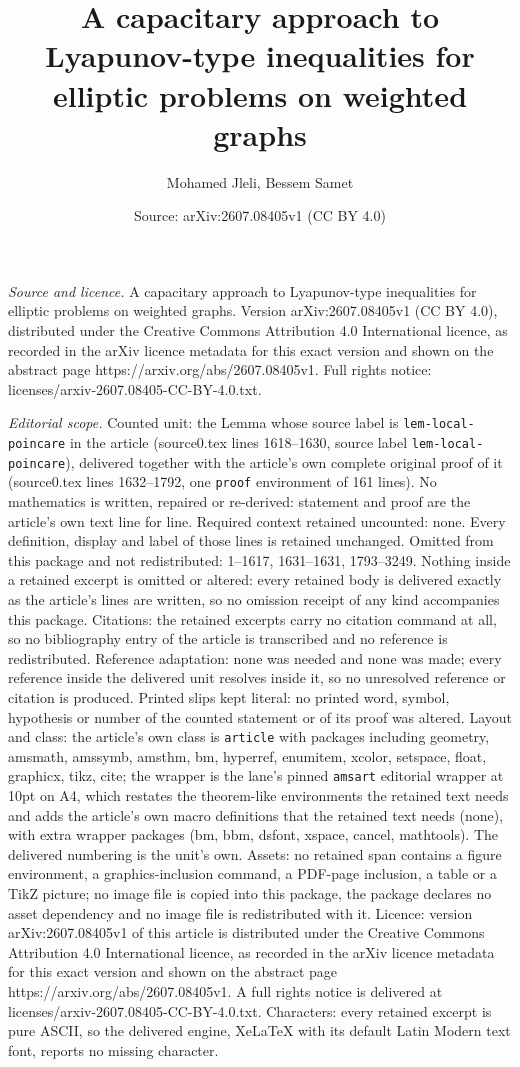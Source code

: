 \documentclass[10pt,a4paper]{amsart}
\title[A capacitary approach to Lyapunov-type inequalities for elli]{A capacitary approach to Lyapunov-type inequalities for elliptic problems on weighted graphs}
\author{Mohamed Jleli, Bessem Samet}
\date{Source: arXiv:2607.08405v1 (CC BY 4.0)}
\begin{document}
\maketitle

\noindent\emph{Source and licence.} A capacitary approach to Lyapunov-type inequalities for elliptic problems on weighted graphs. Version arXiv:2607.08405v1 (CC BY 4.0), distributed under the Creative Commons Attribution 4.0 International licence, as recorded in the arXiv licence metadata for this exact version and shown on the abstract page https://arxiv.org/abs/2607.08405v1. Full rights notice: licenses/arxiv-2607.08405-CC-BY-4.0.txt.\par\smallskip

\noindent\textit{Editorial scope.} Counted unit: the Lemma whose source label is \texttt{lem-local-poincare} in the article (source0.tex lines 1618--1630, source label \texttt{lem-local-poincare}), delivered together with the article's own complete original proof of it (source0.tex lines 1632--1792, one \texttt{proof} environment of 161 lines). No mathematics is written, repaired or re-derived: statement and proof are the article's own text line for line. Required context retained uncounted: none. Every definition, display and label of those lines is retained unchanged. Omitted from this package and not redistributed: 1--1617, 1631--1631, 1793--3249. Nothing inside a retained excerpt is omitted or altered: every retained body is delivered exactly as the article's lines are written, so no omission receipt of any kind accompanies this package. Citations: the retained excerpts carry no citation command at all, so no bibliography entry of the article is transcribed and no reference is redistributed. Reference adaptation: none was needed and none was made; every reference inside the delivered unit resolves inside it, so no unresolved reference or citation is produced. Printed slips kept literal: no printed word, symbol, hypothesis or number of the counted statement or of its proof was altered. Layout and class: the article's own class is \texttt{article} with packages including geometry, amsmath, amssymb, amsthm, bm, hyperref, enumitem, xcolor, setspace, float, graphicx, tikz, cite; the wrapper is the lane's pinned \texttt{amsart} editorial wrapper at 10pt on A4, which restates the theorem-like environments the retained text needs and adds the article's own macro definitions that the retained text needs (none), with extra wrapper packages (bm, bbm, dsfont, xspace, cancel, mathtools). The delivered numbering is the unit's own. Assets: no retained span contains a figure environment, a graphics-inclusion command, a PDF-page inclusion, a table or a TikZ picture; no image file is copied into this package, the package declares no asset dependency and no image file is redistributed with it. Licence: version arXiv:2607.08405v1 of this article is distributed under the Creative Commons Attribution 4.0 International licence, as recorded in the arXiv licence metadata for this exact version and shown on the abstract page https://arxiv.org/abs/2607.08405v1. A full rights notice is delivered at licenses/arxiv-2607.08405-CC-BY-4.0.txt. Characters: every retained excerpt is pure ASCII, so the delivered engine, XeLaTeX with its default Latin Modern text font, reports no missing character.
\end{document}
